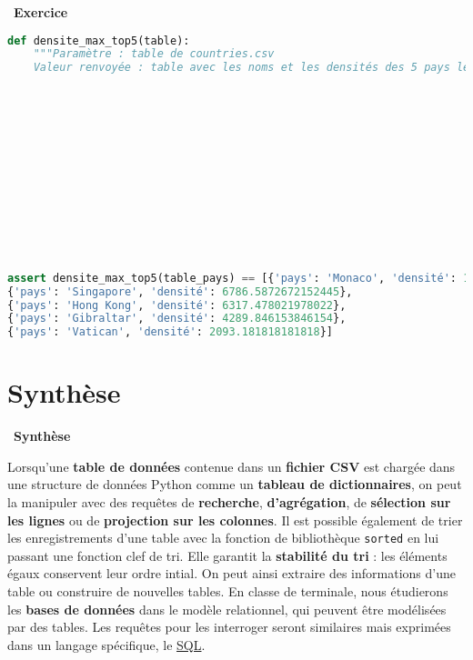 \documentclass[
  11pt,
]{article}
\newcommand{\passthrough}[1]{#1}
\newcounter{exo}
\newenvironment{exercice}[1]
{\par \medskip   \addtocounter{exo}{1} \noindent  
\begin{bclogo}[arrondi =0.1,   noborder = true, logo=\bccrayon, marge=4]{~\textbf{Exercice} \textbf{\theexo} {\itshape #1} }  \par}
{
\end{bclogo}
 \par \bigskip }
\newenvironment{synthese}
{\par \medskip   \noindent   
\begin{bclogo}[arrondi =0.1,   noborder = true, logo=\bccle, marge=4]{~\textbf{Synthèse}   }  \par}
{
\end{bclogo}
 \par \bigskip }
\newcounter{def}
\begin{document}
\begin{exercice}{}
\begin{enumerate}
\begin{lstlisting}[language=Python]
def densite_max_top5(table):
    """Paramètre : table de countries.csv
    Valeur renvoyée : table avec les noms et les densités des 5 pays les plus  densément peuplées dans l'ordre décroissant des densités de population"""













assert densite_max_top5(table_pays) == [{'pays': 'Monaco', 'densité': 16905.128205128207},
{'pays': 'Singapore', 'densité': 6786.5872672152445},
{'pays': 'Hong Kong', 'densité': 6317.478021978022},
{'pays': 'Gibraltar', 'densité': 4289.846153846154},
{'pays': 'Vatican', 'densité': 2093.181818181818}]
\end{lstlisting}
\end{enumerate}

\end{exercice}

\hypertarget{synthuxe8se}{%
\section{Synthèse}\label{synthuxe8se}}

\begin{synthese}{}

Lorsqu'une \textbf{table de données} contenue dans un \textbf{fichier
CSV} est chargée dans une structure de données Python comme un
\textbf{tableau de dictionnaires}, on peut la manipuler avec des
requêtes de \textbf{recherche}, \textbf{d'agrégation}, de
\textbf{sélection sur les lignes} ou de \textbf{projection sur les
colonnes}. Il est possible également de trier les enregistrements d'une
table avec la fonction de bibliothèque \passthrough{\lstinline!sorted!}
en lui passant une fonction clef de tri. Elle garantit la
\textbf{stabilité du tri} : les éléments égaux conservent leur ordre
intial. On peut ainsi extraire des informations d'une table ou
construire de nouvelles tables. En classe de terminale, nous étudierons
les \textbf{bases de données} dans le modèle relationnel, qui peuvent
être modélisées par des tables. Les requêtes pour les interroger seront
similaires mais exprimées dans un langage spécifique, le
\href{https://pixees.fr/informatiquelycee/n_site/nsi_term_bd_sql.html}{SQL}.

\end{synthese}
\end{document}
